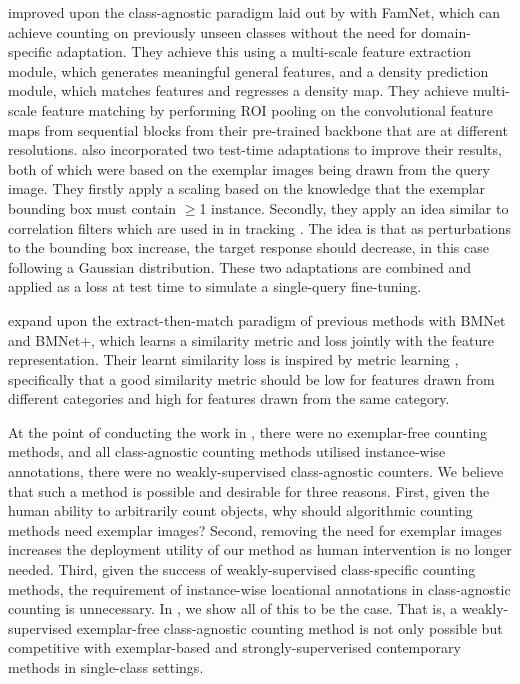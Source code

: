 \documentclass[../thesis.tex]{subfiles}
\begin{document}
\citet{ranjan2021Famnet} improved upon the class-agnostic paradigm laid out by \citet{Lu2018} with FamNet, which can achieve counting on previously unseen classes without the need for domain-specific adaptation. 
They achieve this using a multi-scale feature extraction module, which generates meaningful general features, and a density prediction module, which matches features and regresses a density map.
They achieve multi-scale feature matching by performing ROI pooling on the convolutional feature maps from sequential blocks from their pre-trained backbone that are at different resolutions.
\citet{ranjan2021Famnet} also incorporated two test-time adaptations to improve their results, both of which were based on the exemplar images being drawn from the query image. They firstly apply a scaling based on the knowledge that the exemplar bounding box must contain $\geq$1 instance. Secondly, they apply an idea similar to correlation filters which are used in in tracking \cite{henriques2014high}.
The idea is that as perturbations to the bounding box increase, the target response should decrease, in this case following a Gaussian distribution.
These two adaptations are combined and applied as a loss at test time to simulate a single-query fine-tuning.

\citet{shi2022represent} expand upon the extract-then-match paradigm of previous methods with BMNet and BMNet+, which learns a similarity metric and loss jointly with the feature representation. Their learnt similarity loss is inspired by metric learning \cite{schultz2003learning}, specifically that a good similarity metric should be low for features drawn from different categories and high for features drawn from the same category. 

At the point of conducting the work in , there were no exemplar-free counting methods, and all class-agnostic counting methods utilised instance-wise annotations, \ie there were no weakly-supervised class-agnostic counters.
We believe that such a method is possible and desirable for three reasons.
First, given the human ability to arbitrarily count objects, 
why should algorithmic counting methods need exemplar images?
Second, removing the need for exemplar images increases the deployment utility of our method as human intervention is no longer needed.
Third, given the success of weakly-supervised class-specific counting methods, the requirement of instance-wise locational annotations in class-agnostic counting is unnecessary.
In , we show all of this to be the case. 
That is, a weakly-supervised exemplar-free class-agnostic counting method is not only possible but competitive with exemplar-based and strongly-superverised contemporary methods in single-class settings.
\end{document}
